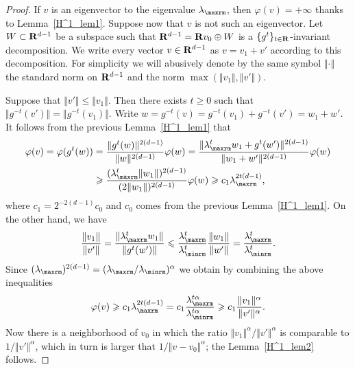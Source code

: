 \begin{proof}
If $v$ is an eigenvector to the eigenvalue $\lambda _{\maxrm}$, then
$\varphi (v) = +\infty$ thanks to Lemma~\ref{H^1_lem1}. Suppose now that $v$ is not such an eigenvector. Let $W \subset {\bf R} ^{d-1}$ be a subspace such that ${\bf R} ^{d-1} = {\bf R} v_0 \oplus W$ is a $\{g^t\}_{t\in {\bf R}}$-invariant decomposition. We write every vector $v \in {\bf R}^{d-1}$ as $v = v_1 + v'$ according to this decomposition. For simplicity we will abusively denote by the same symbol $\Vert \cdot \Vert$ the standard norm on ${\bf R} ^{d-1}$ and the norm $\max (\Vert v_1 \Vert, \Vert v' \Vert)$.

Suppose that $\Vert v' \Vert \leqslant \Vert v_1 \Vert$. Then there exists $t \geqslant 0$ such that $\Vert g^{-t} (v') \Vert = \Vert g^{-t} (v_1) \Vert$. Write $w = g^{-t} (v) = g^{-t}(v_1) + g^{-t}(v') = w_1 + w'$. It follows from the previous Lemma~\ref{H^1_lem1} that
\begin{align*}
\varphi (v) = \varphi (g^t (w)) & = \frac{\Vert g^t(w) \Vert ^{2(d-1)}}{\Vert w \Vert ^{2(d-1)}} \varphi (w) = \frac{\Vert \lambda ^t _{\maxrm} w_1 + g^t(w') \Vert ^{2(d-1)}}{\Vert w_1 + w' \Vert ^{2(d-1)}} \varphi (w)\\
&\geqslant \frac{(\lambda _{\maxrm}^t \Vert w_1 \Vert)^{2(d-1)}}{(2 \Vert w_1 \Vert)^{2(d-1)}} \varphi (w)
\geqslant c_1 \lambda _{\maxrm}^{2t(d-1)},
\end{align*}
where $c_1 = 2 ^{-2(d-1)} c_0$ and $c_0$ comes from the previous Lemma~\ref{H^1_lem1}. On the other hand, we have
\[
\frac{\Vert v_1 \Vert}{\Vert v' \Vert} = \frac{\Vert \lambda _{\maxrm}^t w_1 \Vert}{\Vert g^t(w') \Vert}
\leqslant \frac{\lambda _{\maxrm}^t}{\lambda _{\minrm}^t} \frac{\Vert w_1 \Vert}{\Vert w' \Vert} =
\frac{\lambda _{\maxrm}^t}{\lambda _{\minrm}^t}.
\]
Since $(\lambda _{\maxrm})^{2(d-1)} = (\lambda _{\maxrm} / \lambda _{\minrm})^\alpha$ we obtain by combining the above inequalities
\[
\varphi (v) \geqslant c_1 \lambda _{\maxrm} ^{2t(d-1)} = c_1 \frac{\lambda _{\maxrm}^{t\alpha}}{ \lambda _{\minrm}^{t\alpha}}
\geqslant c_1 \frac{\Vert v_1 \Vert ^\alpha}{\Vert v' \Vert ^\alpha}.
\]
Now there is a neighborhood of $v_0$ in which the ratio $\Vert v_1 \Vert ^\alpha / \Vert v' \Vert ^\alpha$ is comparable to $1 / \Vert v' \Vert ^\alpha$, which in turn is larger that $1/ \Vert v - v_0 \Vert ^\alpha$; the Lemma~\ref{H^1_lem2} follows.
\end{proof}


